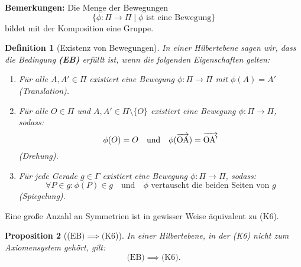 \documentclass[a4paper,12pt]{article}
\theoremstyle{break}
\newtheorem{definition}{Definition}[section]
\newtheorem{proposition}[definition]{Proposition}
\begin{document}
\textbf{Bemerkungen:}
Die Menge der Bewegungen 
\[
\{\phi: \Pi \to \Pi \mid \phi \text{ ist eine Bewegung}\}
\]
bildet mit der Komposition eine Gruppe.

\begin{definition}[Existenz von Bewegungen]
In einer Hilbertebene sagen wir, dass die Bedingung \textbf{(EB)} erfüllt ist, wenn die folgenden Eigenschaften gelten:
\begin{enumerate}
    \item  Für alle \(A, A' \in \Pi\) existiert eine Bewegung \(\phi: \Pi \to \Pi\) mit \(\phi(A) = A'\) (Translation). 
    \item Für alle \(O \in \Pi\) und \(A, A' \in \Pi \setminus \{O\}\) existiert eine Bewegung \(\phi: \Pi \to \Pi\), sodass:
    \[
    \phi(O) = O \quad \text{und} \quad \phi(\overrightarrow{\rm OA}) = \overrightarrow{\rm OA'}
    \] (Drehung).
    \item Für jede Gerade \(g \in \Gamma\) existiert eine Bewegung \(\phi: \Pi \to \Pi\), sodass:
    \[
    \forall P \in g : \phi(P) \in g \quad \text{und} \quad \phi \text{ vertauscht die beiden Seiten von } g
    \] (Spiegelung).
\end{enumerate}
\end{definition}

Eine große Anzahl an Symmetrien ist in gewisser Weise äquivalent zu (K6).

\begin{proposition}[(\(\text{EB}) \implies (\text{K6}\))]\label{prop:eb_k6}
In einer Hilbertebene, in der (K6) nicht zum Axiomensystem gehört, gilt:
\[
\text{(EB)} \implies \text{(K6)}.
\]
\end{proposition}
\end{document}
